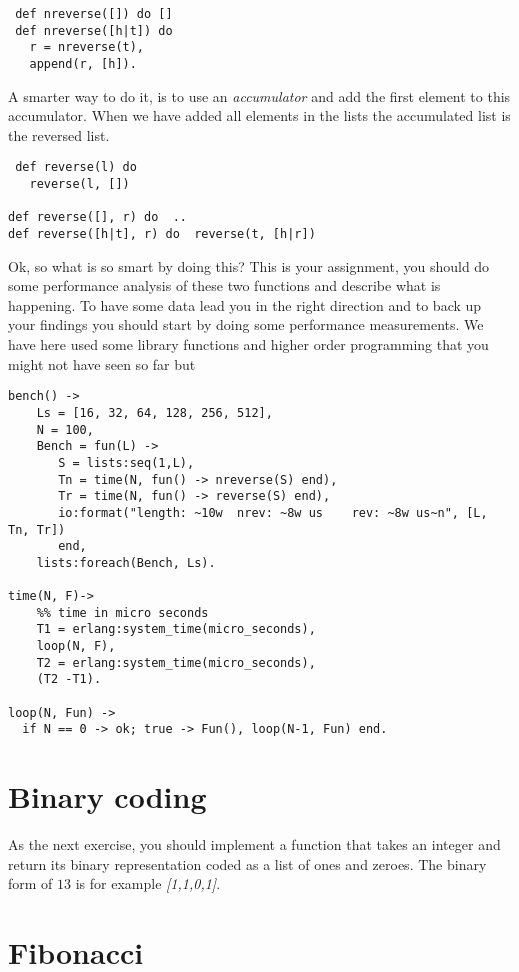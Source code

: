 \documentclass[a4paper,11pt]{article}
\begin{document}
{\begin{verbatim}
 def nreverse([]) do []
 def nreverse([h|t]) do 
   r = nreverse(t),
   append(r, [h]).
\end{verbatim}

A smarter way to do it, is to use an {\em accumulator} and add the
first element to this accumulator. When we have added all elements in
the lists the accumulated list is the reversed list.

\begin{verbatim}
 def reverse(l) do
   reverse(l, [])

def reverse([], r) do  ..
def reverse([h|t], r) do  reverse(t, [h|r])
\end{verbatim}

Ok, so what is so smart by doing this? This is your assignment, you
should do some performance analysis of these two functions and
describe what is happening. To have some data lead you in the right
direction and to back up your findings you should start by doing some
performance measurements. We have here used some library functions and
higher order programming that you might not have seen so far but 


\begin{verbatim}
bench() ->
    Ls = [16, 32, 64, 128, 256, 512],
    N = 100,
    Bench = fun(L) ->
       S = lists:seq(1,L),
       Tn = time(N, fun() -> nreverse(S) end),
       Tr = time(N, fun() -> reverse(S) end),
       io:format("length: ~10w  nrev: ~8w us    rev: ~8w us~n", [L, Tn, Tr])
       end,
    lists:foreach(Bench, Ls).

time(N, F)->
    %% time in micro seconds
    T1 = erlang:system_time(micro_seconds),
    loop(N, F),
    T2 = erlang:system_time(micro_seconds),
    (T2 -T1).

loop(N, Fun) ->
  if N == 0 -> ok; true -> Fun(), loop(N-1, Fun) end.
\end{verbatim}


\section{Binary coding}

As the next exercise, you should implement a function that takes an
integer and return its binary representation coded as a list of ones
and zeroes. The binary form of $13$ is for example {\em [1,1,0,1]}. 



\section{Fibonacci}

}
\end{document}
